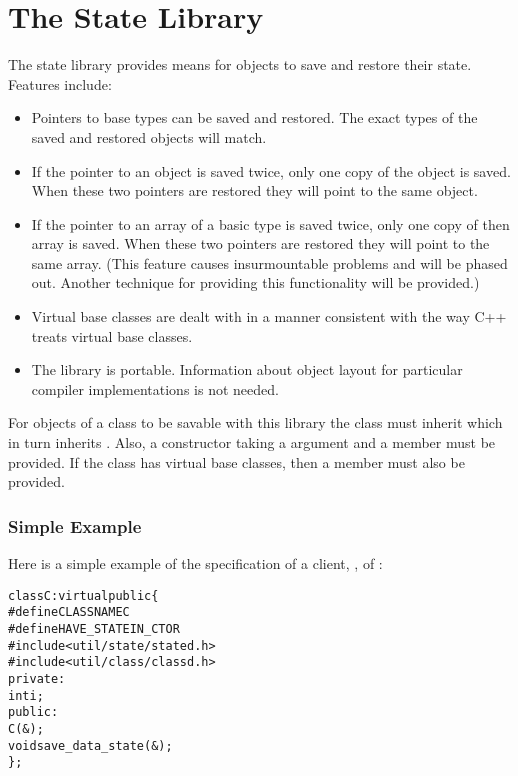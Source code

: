 
\chapter{The State Library}

The state library provides means for objects to save and restore their
state.  Features include:

\begin{itemize}
\item
  Pointers to base types can be saved and restored.
  The exact types of the saved and restored objects will match.
\item
  If the pointer to an object is saved twice, only one copy of the
  object is saved.  When these two pointers are restored they will
  point to the same object.
\item
  If the pointer to an array of a basic type is saved twice,
  only one copy of then
  array is saved.  When these two pointers are restored they will
  point to the same array.  (This feature causes insurmountable
  problems and will be phased out.  Another technique for providing this
  functionality will be provided.)
\item
  Virtual base classes are dealt with in a manner consistent with
  the way C++ treats virtual base classes.
\item
  The library is portable.  Information about object layout for
  particular compiler implementations is not needed.
\end{itemize}

For objects of a class to be savable with this library the class must
inherit  which in turn inherits
.  Also, a constructor taking a
\srccd{\&} argument and a
 member must be provided.  If
the class has virtual base classes, then a
 member must also be
provided.

\subsection{Simple Example}

Here is a simple example of the specification of a client, ,
of :
\begin{alltt}
class C: virtual public  \{
# define CLASSNAME C
# define HAVE_STATEIN_CTOR
# include <util/state/stated.h>
# include <util/class/classd.h>
  private:
    int i;
  public:
    C(&);
    void save_data_state(&);
  \};
\end{alltt}


